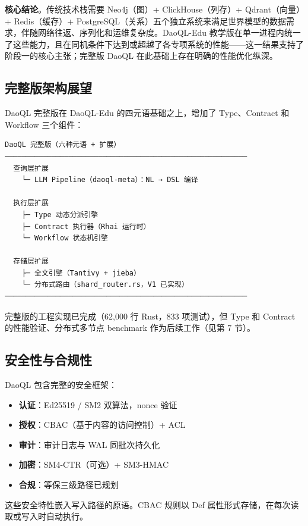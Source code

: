 \documentclass[11pt,a4paper]{ctexart}
\begin{document}
\textbf{核心结论}。传统技术栈需要 Neo4j（图）+ ClickHouse（列存）+
Qdrant（向量）+ Redis（缓存）+
PostgreSQL（关系）五个独立系统来满足世界模型的数据需求，伴随网络往返、序列化和运维复杂度。DaoQL-Edu
教学版在单一进程内统一了这些能力，且在同机条件下达到或超越了各专项系统的性能------这一结果支持了阶段一的核心主张；完整版
DaoQL 在此基础上存在明确的性能优化纵深。

\subsection{完整版架构展望}\label{ux5b8cux6574ux7248ux67b6ux6784ux5c55ux671b}

DaoQL 完整版在 DaoQL-Edu 的四元语基础之上，增加了 Type、Contract 和
Workflow 三个组件：

\begin{verbatim}
DaoQL 完整版（六种元语 + 扩展）
─────────────────────────────────────────────────────────
  查询层扩展
    └─ LLM Pipeline（daoql-meta）：NL → DSL 编译

  执行层扩展
    ├─ Type 动态分派引擎
    ├─ Contract 执行器（Rhai 运行时）
    └─ Workflow 状态机引擎

  存储层扩展
    ├─ 全文引擎（Tantivy + jieba）
    └─ 分布式路由（shard_router.rs，V1 已实现）
─────────────────────────────────────────────────────────
\end{verbatim}

完整版的工程实现已完成（62,000 行 Rust，833 项测试），但 Type 和
Contract 的性能验证、分布式多节点 benchmark 作为后续工作（见第 7 节）。

\subsection{安全性与合规性}\label{ux5b89ux5168ux6027ux4e0eux5408ux89c4ux6027}

DaoQL 包含完整的安全框架：

\begin{itemize}
\tightlist
\item
  \textbf{认证}：Ed25519 / SM2 双算法，nonce 验证
\item
  \textbf{授权}：CBAC（基于内容的访问控制）+ ACL
\item
  \textbf{审计}：审计日志与 WAL 同批次持久化
\item
  \textbf{加密}：SM4-CTR（可选）+ SM3-HMAC
\item
  \textbf{合规}：等保三级路径已规划
\end{itemize}

这些安全特性嵌入写入路径的原语。CBAC 规则以 Def
属性形式存储，在每次读取或写入时自动执行。
\end{document}
